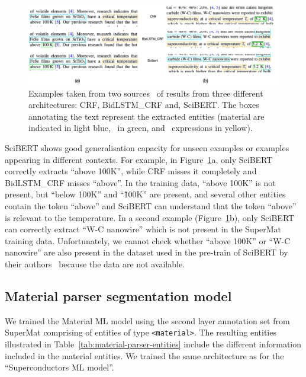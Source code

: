\begin{figure}[htbp]
    \centering
    \includegraphics[width=\textwidth]{figures/automatic_extraction_supercon/example-comparison-archs.png}
    \caption{Examples taken from two sources~\cite{Gajda_2016, Shibata_2016} of results from three different architectures: CRF, BidLSTM\_CRF and, SciBERT. The boxes annotating the text represent the extracted entities (material are indicated in light blue, \tc~in green, and \tc~expressions in yellow).}
    \label{fig:example-comparison-architectures}
\end{figure}

SciBERT shows good generalisation capacity for unseen examples or examples appearing in different contexts.
For example, in Figure~\ref{fig:example-comparison-architectures}a, only SciBERT correctly extracts ``above 100K'', while CRF misses it completely and BidLSTM\_CRF misses ``above''.
In the training data, ``above 100K'' is not present, but ``below 100K'' and ``\~100K'' are present, and several other entities contain the token ``above'' and SciBERT can understand that the token ``above'' is relevant to the temperature.
In a second example (Figure~\ref{fig:example-comparison-architectures}b), only SciBERT can correctly extract ``W-C nanowire'' which is not present in the SuperMat training data.
Unfortunately, we cannot check whether ``above 100K'' or ``W-C nanowire'' are also present in the dataset used in the pre-train of SciBERT by their authors~\cite{Beltagy2019SciBERT} because the data are not available.


\subsection{Material parser segmentation model}

We trained the Material ML model using the second layer annotation set from SuperMat comprising of entities of type \texttt{<material>}.
The resulting entities illustrated in Table~\ref{tab:material-parser-entities} include the different information included in the material entities.
We trained the same architecture as for the ``Superconductors ML model''.

